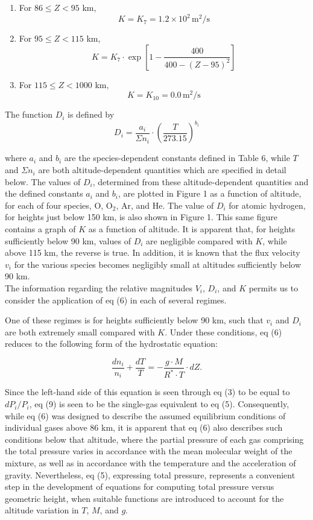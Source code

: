 \documentclass{article}
\begin{document}
\begin{enumerate}
    \item For $86 \leq Z < 95$ km,
    \[
    K = K_7 = 1.2 \times 10^2 \, \text{m}^2/\text{s} \tag{7a}
    \]

    \item For $95 \leq Z < 115$ km,
    \[
    K = K_7 \cdot \exp\left[1 - \frac{400}{400 - (Z - 95)^2}\right] \tag{7b}
    \]

    \item For $115 \leq Z < 1000$ km,
    \[
    K = K_{10} = 0.0 \, \text{m}^2/\text{s} \tag{7c}
    \]
\end{enumerate}

The function $D_i$ is defined by
\[
D_i = \frac{a_i}{\Sigma n_i} \cdot \left(\frac{T}{273.15}\right)^{b_i} \tag{8}
\]

where $a_i$ and $b_i$ are the species-dependent constants defined in Table 6, while $T$ and $\Sigma n_i$ are both altitude-dependent quantities which are specified in detail below. The values of $D_i$, determined from these altitude-dependent quantities and the defined constants $a_i$ and $b_i$, are plotted in Figure 1 as a function of altitude, for each of four species, O, O$_2$, Ar, and He. The value of $D_i$ for atomic hydrogen, for heights just below 150 km, is also shown in Figure 1. This same figure contains a graph of $K$ as a function of altitude. It is apparent that, for heights sufficiently below 90 km, values of $D_i$ are negligible compared with $K$, while above 115 km, the reverse is true. In addition, it is known that the flux velocity $v_i$ for the various species becomes negligibly small at altitudes sufficiently below 90 km.\\

The information regarding the relative magnitudes $V_i$, $D_i$, and $K$ permits us to consider the application of eq (6) in each of several regimes.

One of these regimes is for heights sufficiently below 90 km, such that $v_i$ and $D_i$ are both extremely small compared with $K$. Under these conditions, eq (6) reduces to the following form of the hydrostatic equation:

\[
\frac{d n_i}{n_i} + \frac{dT}{T} = -\frac{g \cdot M}{R^* \cdot T} \cdot dZ. \tag{9}
\]

Since the left-hand side of this equation is seen through eq (3) to be equal to $dP_i / P_i$, eq (9) is seen to be the single-gas equivalent to eq (5). Consequently, while eq (6) was designed to describe the assumed equilibrium conditions of individual gases above 86 km, it is apparent that eq (6) also describes such conditions below that altitude, where the partial pressure of each gas comprising the total pressure varies in accordance with the mean molecular weight of the mixture, as well as in accordance with the temperature and the acceleration of gravity. Nevertheless, eq (5), expressing total pressure, represents a convenient step in the development of equations for computing total pressure versus geometric height, when suitable functions are introduced to account for the altitude variation in $T$, $M$, and $g$.
\end{document}
